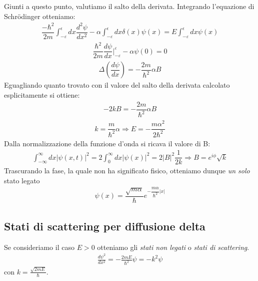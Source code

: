 Giunti a questo punto, valutiamo il salto della derivata. 
Integrando l'equazione di Schrödinger otteniamo:
\begin{equation}\begin{split}
\dfrac{-\hbar^2}{2m}\int_{-\varepsilon} ^{\epsilon} dx \dfrac{d^2\psi}{dx^2}-\alpha \int_{-\varepsilon} ^{\epsilon} dx \delta (x) \psi (x) = E \int_{-\varepsilon} ^{\epsilon} dx \psi (x)
\end{split}\end{equation}
\begin{equation}\begin{split}
\dfrac{\hbar^2}{2m} \dfrac{d\psi}{dx} | _{- \varepsilon} ^{\varepsilon} -\alpha \psi(0)=0
\end{split}\end{equation}
\begin{equation}\begin{split}
\Delta \left( \dfrac{d\psi}{dx}\right)=- \dfrac{2m}{\hbar^2} \alpha B
\end{split}\end{equation}
Eguagliando quanto trovato con il valore del salto della derivata calcolato esplicitamente si ottiene:
\begin{equation}\begin{split}
-2kB=- \dfrac{2m}{\hbar^2} \alpha B
\end{split}\end{equation}
\begin{equation}\begin{split}
k=\dfrac{m}{\hbar^2}\alpha \Longrightarrow E=-\dfrac{m\alpha^2}{2\hbar^2}
\end{split}\end{equation}
Dalla normalizzazione della funzione d'onda si ricava il valore di B:
\begin{equation}\begin{split}
\int _{-\infty} ^\infty dx |\psi (x,t)|^2=2\int_0 ^\infty dx |\psi (x)|^2=2|B|^2 \dfrac{1}{2k} \Longrightarrow B=e^{i\phi} \sqrt{k}
\end{split}\end{equation}
Trascurando la fase, la quale non ha significato fisico, otteniamo dunque \emph{un solo} stato legato
\begin{equation}\begin{split}
\psi (x)=\dfrac{\sqrt{m\alpha}}{\hbar} e^{-\dfrac{m\alpha}{\hbar^2}|x|}
\end{split}\end{equation}

\subsection{Stati di scattering per diffusione delta}
Se consideriamo il caso $E>0$ otteniamo gli \emph{stati non legati} o \emph{stati di scattering}.
\begin{equation}\begin{split}
\frac{d\psi ^2}{dx^2}=-\frac{2mE}{\hbar ^2}\psi =-k^2\psi 
\end{split}\end{equation}
con $k=\frac{\sqrt{2mE}}{\hbar }$.

